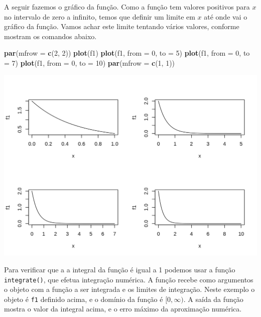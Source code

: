 \documentclass[10pt,a4paper]{book}
\newenvironment{Shaded}{\begin{snugshade}}{\end{snugshade}}
\newcommand{\KeywordTok}[1]{\textcolor[rgb]{0.13,0.29,0.53}{\textbf{#1}}}
\newcommand{\DataTypeTok}[1]{\textcolor[rgb]{0.13,0.29,0.53}{#1}}
\newcommand{\DecValTok}[1]{\textcolor[rgb]{0.00,0.00,0.81}{#1}}
\newcommand{\NormalTok}[1]{#1}
\begin{document}
A seguir fazemos o gráfico da função. Como a função tem valores
positivos para \(x\) no intervalo de zero a infinito, temos que definir
um limite em \(x\) até onde vai o gráfico da função. Vamos achar este
limite tentando vários valores, conforme mostram os comandos abaixo.

\begin{Shaded}
\begin{Highlighting}[]
\KeywordTok{par}\NormalTok{(}\DataTypeTok{mfrow =} \KeywordTok{c}\NormalTok{(}\DecValTok{2}\NormalTok{, }\DecValTok{2}\NormalTok{))}
\KeywordTok{plot}\NormalTok{(f1)}
\KeywordTok{plot}\NormalTok{(f1, }\DataTypeTok{from =} \DecValTok{0}\NormalTok{, }\DataTypeTok{to =} \DecValTok{5}\NormalTok{)}
\KeywordTok{plot}\NormalTok{(f1, }\DataTypeTok{from =} \DecValTok{0}\NormalTok{, }\DataTypeTok{to =} \DecValTok{7}\NormalTok{)}
\KeywordTok{plot}\NormalTok{(f1, }\DataTypeTok{from =} \DecValTok{0}\NormalTok{, }\DataTypeTok{to =} \DecValTok{10}\NormalTok{)}
\KeywordTok{par}\NormalTok{(}\DataTypeTok{mfrow =} \KeywordTok{c}\NormalTok{(}\DecValTok{1}\NormalTok{, }\DecValTok{1}\NormalTok{))}
\end{Highlighting}
\end{Shaded}

\begin{center}\includegraphics{figures/unnamed-chunk-326-1} \end{center}

Para verificar que a a integral da função é igual a 1 podemos usar a
função \texttt{integrate()}, que efetua integração numérica. A função
recebe como argumentos o objeto com a função a ser integrada e os
limites de integração. Neste exemplo o objeto é \texttt{f1} definido
acima, e o domínio da função é \([0, \infty)\). A saída da função mostra
o valor da integral acima, e o erro máximo da aproximação numérica.
\end{document}
